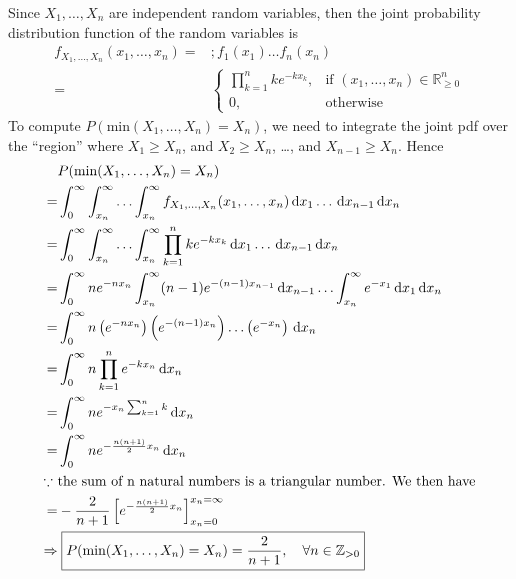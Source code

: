 \documentclass{mthe353answer}
\begin{document}
\begin{questions}
  \setcounter{question}{4}
  \question{}
  Since \(X_1,\ldots,X_n\) are independent random variables, then the joint
  probability distribution function of the random variables is 
  \begin{align*}
    f_{X_1,\ldots,X_n}(x_1,\ldots,x_n) =&; f_1(x_1)\ldots f_n(x_n)\\
    =&
    \begin{cases}
      \prod_{k=1}^{n} ke^{-kx_k}, & \text{if } (x_1,\dots,x_n) \in \mathbb{R}_{\ge0}^{n}\\
      0, & \text{otherwise}
    \end{cases}
  \end{align*}
  To compute \(P(\text{min}(X_1,\ldots,X_n)=X_n)\), we need to integrate the 
  joint pdf over the ``region'' where \(X_1 \ge X_n\), and \(X_2 \ge X_n\),
  \ldots, and \(X_{n-1} \ge X_n\). Hence
  \begin{align*}
    & P(\text{min}(X_1,\ldots,X_n)=X_n)\\
    =& \int_{0}^{\infty}\int_{x_n}^{\infty}\ldots\int_{x_n}^{\infty} f_{X_1,\ldots,X_n}(x_1,\ldots,x_n)
      \, \mathrm{d}x_1\ldots \, \mathrm{d}x_{n-1} \, \mathrm{d}x_n\\
    =& \int_{0}^{\infty}\int_{x_n}^{\infty}\ldots\int_{x_n}^{\infty} 
      \prod_{k=1}^{n} ke^{-kx_k}
      \, \mathrm{d}x_1\ldots \, \mathrm{d}x_{n-1} \, \mathrm{d}x_n\\
    =& \int_{0}^{\infty} ne^{-nx_n} \int_{x_n}^{\infty} (n-1)e^{-(n-1)x_{n-1}} \, \mathrm{d}x_{n-1} \ldots \int_{x_n}^{\infty} e^{-x_1} 
      \, \mathrm{d}x_1 \, \mathrm{d}x_n\\
    =& \int_{0}^{\infty} n\left(e^{-nx_n}\right) \left(e^{-(n-1)x_n}\right) \ldots \left(e^{-x_n}\right) \, \mathrm{d}x_n\\
    =& \int_{0}^{\infty} n \prod_{k=1}^{n} e^{-kx_n} \, \mathrm{d}x_n\\
    =& \int_{0}^{\infty} n e^{-x_n\sum_{k=1}^{n}k} \, \mathrm{d}x_n\\
    =& \int_{0}^{\infty} n e^{-\frac{n(n+1)}{2}x_n} \, \mathrm{d}x_n\\
    \intertext{\(\because\) the sum of n natural numbers is a triangular number. We then have}
    =& -\frac{2}{n+1}\left[e^{-\frac{n(n+1)}{2}x_n}\right]_{x_n=0}^{x_n=\infty}\\
    \Rightarrow &\; \boxed{P(\text{min}(X_1,\ldots,X_n)=X_n) = \frac{2}{n+1},\quad \forall n \in \mathbb{Z}_{>0} }
  \end{align*}


\end{questions}
\end{document}

